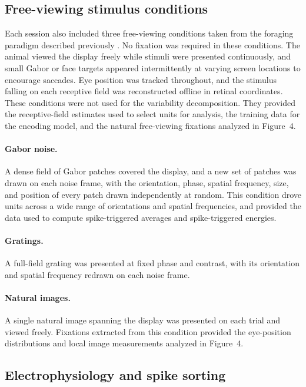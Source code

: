 \documentclass{lite}
\begin{document}
\subsection{Free-viewing stimulus conditions}

Each session also included three free-viewing conditions taken from the foraging
paradigm described previously \cite{yates2023detailed}. No fixation was required in
these conditions. The animal viewed the display freely while stimuli were
presented continuously, and small Gabor or face targets appeared intermittently at
varying screen locations to encourage saccades. Eye position was tracked
throughout, and the stimulus falling on each receptive field was reconstructed
offline in retinal coordinates. These conditions were not used for the
variability decomposition. They provided the receptive-field estimates used to
select units for analysis, the training data for the encoding model, and the natural
free-viewing fixations analyzed in Figure~4.

\paragraph{Gabor noise.} A dense field of Gabor patches covered the display, and a
new set of patches was drawn on each noise frame, with the orientation, phase,
spatial frequency, size, and position of every patch drawn independently at random.
This condition drove units across a wide range of orientations and spatial
frequencies, and provided the data used to compute spike-triggered averages and
spike-triggered energies.

\paragraph{Gratings.} A full-field grating was presented at fixed phase and
contrast, with its orientation and spatial frequency redrawn on each noise frame.

\paragraph{Natural images.} A single natural image spanning the display was
presented on each trial and viewed freely. Fixations extracted from this condition
provided the eye-position distributions and local image measurements analyzed in
Figure~4.

\subsection{Electrophysiology and spike sorting}
\end{document}
